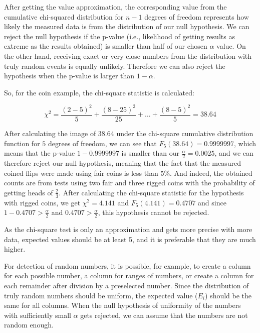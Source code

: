 \documentclass[
  digital, %
  color,   %
  oneside, %
  lof,     %
  nolot,     %
]{fithesis4}
\begin{document}
After getting the value approximation, the corresponding value from the cumulative chi-squared distribution for $n - 1$ degrees of freedom represents how likely the measured data is from the distribution of our null hypothesis.
We can reject the null hypothesis if the p-value (i.e., likelihood of getting results as extreme as the results obtained) is smaller than half of our chosen $\alpha$ value.
On the other hand, receiving exact or very close numbers from the distribution with truly random events is equally unlikely.
Therefore we can also reject the hypothesis when the p-value is larger than $1 - \alpha$. \cite{knuth81}

So, for the coin example, the chi-square statistic is calculated:

\begin{equation}
  \chi^2 = \frac{(2 - 5)^2}{5} + \frac{(8 - 25)^2}{25} + \dots + \frac{(8 - 5)^2}{5} = 38.64
  \label{eq:chi2-statistic-example}
\end{equation}

After calculating the image of 38.64 under the chi-square cumulative distribution function for $5$ degrees of freedom, we can see that $F_5(38.64) = 0.9999997$, which means that the p-value $1 - 0.9999997$ is smaller than our $\frac{\alpha}{2} = 0.0025$, and we can therefore reject our null hypothesis, meaning that the fact that the measured coined flips were made using fair coins is less than 5\%.
And indeed, the obtained counts are from tests using two fair and three rigged coins with the probability of getting heads of $\frac{2}{3}$.
After calculating the chi-square statistic for the hypothesis with rigged coins, we get $\chi^2 = 4.141$ and $F_5(4.141) = 0.4707$ and since $1 - 0.4707 > \frac{\alpha}{2}$ and $0.4707 > \frac{\alpha}{2}$, this hypothesis cannot be rejected.

As the chi-square test is only an approximation and gets more precise with more data, expected values should be at least 5, and it is preferable that they are much higher. \cite{knuth81}

For detection of random numbers, it is possible, for example, to create a column for each possible number, a column for ranges of numbers, or create a column for each remainder after division by a preselected number.
Since the distribution of truly random numbers should be uniform, the expected value ($E_i$) should be the same for all columns.
When the null hypothesis of uniformity of the numbers with sufficiently small $\alpha$ gets rejected, we can assume that the numbers are not random enough.
\end{document}
